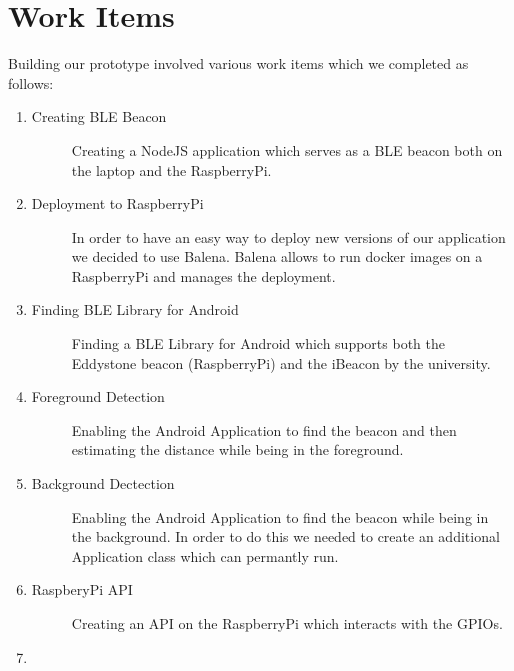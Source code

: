 \documentclass[
10pt, %
a4paper, %
oneside, %
headinclude,footinclude, %
BCOR5mm, %
]{scrartcl}
\begin{document}
\section{Work Items}
Building our prototype involved various work items which we completed as follows:
\begin{enumerate}
\item 
	\begin{description}
	\item[Creating BLE Beacon] Creating a NodeJS application which serves as a BLE beacon both on the laptop and the RaspberryPi.
	\end{description}
\item 
	\begin{description}
	\item[Deployment to RaspberryPi] In order to have an easy way to deploy new versions of our application we decided to use Balena. Balena allows to run docker images on a RaspberryPi and manages the deployment.
	\end{description}
	\item 
	\begin{description}
		\item[Finding BLE Library for Android] Finding a BLE Library for Android which supports both the Eddystone beacon (RaspberryPi) and the iBeacon by the university.
	\end{description}
	\item 
	\begin{description}
		\item[Foreground Detection] Enabling the Android Application to find the beacon and then estimating the distance while being in the foreground.
	\end{description}
	\item 
	\begin{description}
		\item[Background Dectection] Enabling the Android Application to find the beacon while being in the background. In order to do this we needed to create an additional Application class which can permantly run.
	\end{description}
	\item 
		\begin{description}
		\item[RaspberyPi API] Creating an API on the RaspberryPi which interacts with the GPIOs.
	\end{description}
	\item 
		\begin{description}

\end{description}
\end{enumerate}
\end{document}
